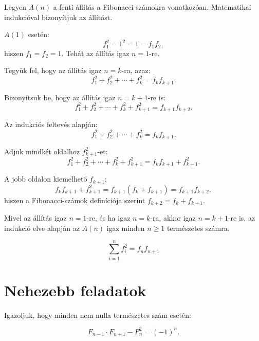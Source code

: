 \begin{solution}
Legyen $A(n)$ a fenti állítás a Fibonacci-számokra vonatkozóan. Matematikai
indukcióval bizonyítjuk az állítást.

$A(1)$ esetén: 
\[
f_{1}^{2}=1^{2}=1=f_{1}f_{2},
\]
hiszen $f_{1}=f_{2}=1$. Tehát az állítás igaz $n=1$-re.

\noindent Tegyük fel, hogy az állítás igaz $n=k$-ra, azaz: 
\[
f_{1}^{2}+f_{2}^{2}+\cdots+f_{k}^{2}=f_{k}f_{k+1}.
\]

\noindent Bizonyítsuk be, hogy az állítás igaz $n=k+1$-re is: 
\[
f_{1}^{2}+f_{2}^{2}+\cdots+f_{k}^{2}+f_{k+1}^{2}=f_{k+1}f_{k+2}.
\]

\noindent Az indukciós feltevés alapján: 
\[
f_{1}^{2}+f_{2}^{2}+\cdots+f_{k}^{2}=f_{k}f_{k+1}.
\]

\noindent Adjuk mindkét oldalhoz $f_{k+1}^{2}$-et: 
\[
f_{1}^{2}+f_{2}^{2}+\cdots+f_{k}^{2}+f_{k+1}^{2}=f_{k}f_{k+1}+f_{k+1}^{2}.
\]

\noindent A jobb oldalon kiemelhető $f_{k+1}$: 
\[
f_{k}f_{k+1}+f_{k+1}^{2}=f_{k+1}(f_{k}+f_{k+1})=f_{k+1}f_{k+2},
\]
hiszen a Fibonacci-számok definíciója szerint $f_{k+2}=f_{k}+f_{k+1}$.

Mivel az állítás igaz $n=1$-re, és ha igaz $n=k$-ra, akkor igaz
$n=k+1$-re is, az indukció elve alapján az $A(n)$ igaz minden $n\geq1$
természetes számra.

\[
\boxed{\sum_{i=1}^{n}f_{i}^{2}=f_{n}f_{n+1}}
\]
\end{solution}

\section*{Nehezebb feladatok}
\begin{extraproblem}
Igazoljuk, hogy minden nem nulla természetes szám esetén:

\[
F_{n-1}\cdot F_{n+1}-F_{n}^{2}=(-1)^{n}.
\]
\end{extraproblem}


